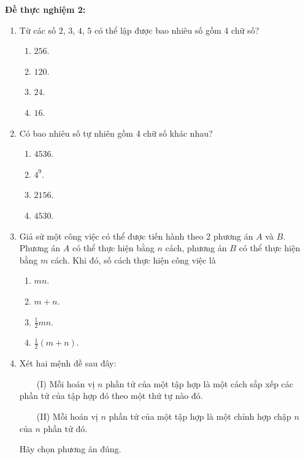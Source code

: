 \noindent\textbf{Đề thực nghiệm 2:}
\begin{enumerate}[label=\textbf{Câu \arabic*.},align=left,left=0cm..0cm,itemindent=*]
	\item Từ các số $2$, $3$, $4$, $5$ có thể lập được bao nhiêu số gồm 4 chữ số?
	\begin{multicols}{4}\begin{enumerate}[label=\textbf{\Alph*.},align=left,left=1cm..0cm,itemindent=*]
		\item $256$. \item $120$. \item $24$. \item $16$.
	\end{enumerate}\end{multicols}
	\item Có bao nhiêu số tự nhiên gồm 4 chữ số khác nhau?
	\begin{multicols}{4}\begin{enumerate}[label=\textbf{\Alph*.},align=left,left=1cm..0cm,itemindent=*]
		\item $4536$. \item $4^9$. \item $2156$. \item $4530$.
	\end{enumerate}\end{multicols}
	\item Giả sử một công việc có thể được tiến hành theo 2 phương án $A$ và $B$. Phương án $A$ có thể thực hiện bằng $n$ cách, phương án $B$ có thể thực hiện bằng $m$ cách. Khi đó, số cách thực hiện công việc là
	\begin{multicols}{4}\begin{enumerate}[label=\textbf{\Alph*.},align=left,left=1cm..0cm,itemindent=*]
		\item $mn$. \item $m+n$. \item $\frac 12mn$. \item $\frac 12(m+n)$.
	\end{enumerate}\end{multicols}
	\item Xét hai mệnh đề sau đây:\par
	~~~~(I) Mỗi hoán vị $n$ phần tử của một tập hợp là một cách sắp xếp các phần tử của tập hợp đó theo một thứ tự nào đó.\par
	~~~~(II) Mỗi hoán vị $n$ phần tử của một tập hợp là một chỉnh hợp chập $n$ của $n$ phần tử đó.\par
	Hãy chọn phương án đúng.

\end{enumerate}
